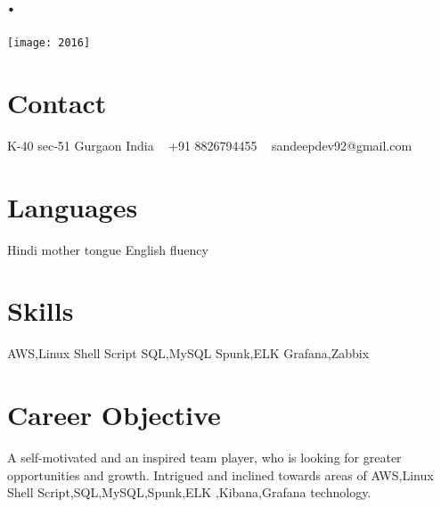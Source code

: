 \documentclass[]{cs-style} %
\begin{document}
\begin{aside}
\section{.}
\texttt{[image: 2016]}
\section{Contact}
K-40 sec-51 
Gurgaon
India
~
+91 8826794455
~
sandeepdev92@gmail.com
\section{Languages}
Hindi mother tongue
English fluency
\section{Skills}
AWS,Linux Shell Script
SQL,MySQL
Spunk,ELK
Grafana,Zabbix
\end{aside}
\section{Career Objective}
  \vspace{-0.3cm}
A self-motivated and an inspired team player, who is looking for greater opportunities and growth. Intrigued and inclined towards areas of AWS,Linux Shell Script,SQL,MySQL,Spunk,ELK ,Kibana,Grafana technology. 
\end{document}
